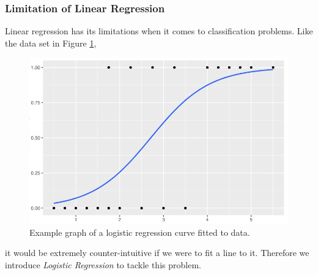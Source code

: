\documentclass[12pt, twoside]{article}
\begin{document}
\begin{multicols*}{2}
		\subsubsection{Limitation of Linear Regression}
		Linear regression has its limitations when it comes to classification problems. Like the data set in Figure \ref{fig:logis-eg},
		\begin{figure}[H]
			\centering
			\includegraphics[width=\columnwidth]{logis-eg}
			\caption{Example graph of a logistic regression curve fitted to data.\cite{enwiki:1188449633}}
			\label{fig:logis-eg}
		\end{figure}
		\noindent it would be extremely counter-intuitive if we were to fit a line to it. Therefore we introduce \textit{Logistic Regression} to tackle this problem.
		

\end{multicols*}
\end{document}
